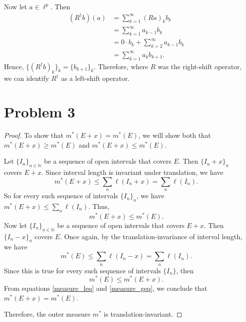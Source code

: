 \documentclass{article}
\begin{document}
Now let $a\in\ell^p$. Then 
\begin{align}
	\left(R^{\dagger}b\right)(a) &= \sum_{k=1}^{\infty}\left(Ra\right)_k b_k \\
	&= \sum_{k=1}^{\infty} a_{k-1}b_k \\
	&= 0\cdot b_k + \sum_{k=2}^{\infty}a_{k-1}b_k \\
	&= \sum_{k=1}^{\infty}a_k b_{k+1}. 
\end{align}
Hence, $\{\left(R^{\dagger}b\right)_k\}_k = \{b_{k+1}\}_k$. Therefore, where $R$ was the right-shift operator, we can identify $R^{\dagger}$ as a left-shift operator.
\section*{Problem 3}
\begin{proof}
	To show that $m^*(E+x)=m^*(E)$, we will show both that \\$m^*(E+x)\geq m^*(E)$ and $m^*(E+x)\leq m^*(E)$.
	
	Let $\{I_n\}_{n\in\mathbb{N}}$ be a sequence of open intervals that covers $E$. Then $\{I_n + x\}_n$ covers $E+x$. Since interval length is invariant under translation, we have
	\begin{equation}
		m^*(E+x) \leq \sum_n \ell(I_n+x) = \sum_n\ell(I_n).
	\end{equation}
	So for every such sequence of intervals $\{I_n\}_n$, we have $m^*(E+x)\leq \sum_n\ell(I_n)$. Thus, 
	\begin{equation}\label{measure_leq}
		m^*(E+x)\leq m^*(E).
	\end{equation}
	Now let $\{I_n\}_{n\in\mathbb{N}}$ be a sequence of open intervals that covers $E+x$. Then $\{I_n-x\}_n$ covers $E$. Once again, by the translation-invariance of interval length, we have
	\begin{equation}
		m^*(E) \leq \sum_n\ell(I_n-x) = \sum_n\ell(I_n).
	\end{equation}
	Since this is true for every such sequence of intervals $\{I_n\}$, then
	\begin{equation}\label{measure_geq}
		m^*(E) \leq m^*(E+x).
	\end{equation}
	From equations \eqref{measure_leq} and \eqref{measure_geq}, we conclude that $m^*(E+x)=m^*(E)$.
	
	Therefore, the outer measure $m^*$ is translation-invariant.
\end{proof}
\end{document}
